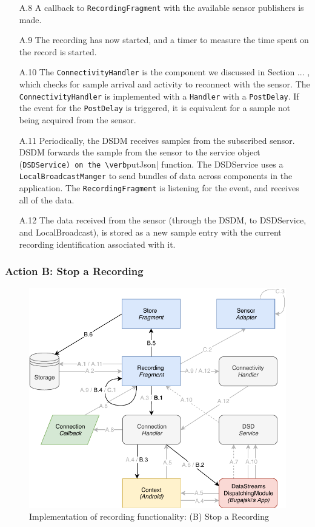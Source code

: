 \begin{itemize}
	\item[A.8] A callback to \verb|RecordingFragment|  with the available sensor publishers is made. 
	\item[A.9] The recording has now started, and a timer to measure the time spent on the record is started. 
	\item[A.10] The \verb|ConnectivityHandler| is the component we discussed in Section ... , which checks for sample arrival and activity to reconnect with the sensor. The \verb|ConnectivityHandler| is implemented with a \verb|Handler| with a \verb|PostDelay|. If the event for the \verb|PostDelay| is triggered, it is equivalent for a sample not being acquired from the sensor. 
	\item[A.11] Periodically, the DSDM receives samples from the subscribed sensor. DSDM forwards the sample from the sensor to the service object (\verb|DSDService) on the \verb|putJson| function. The DSDService uses a \verb|LocalBroadcastManger| to send bundles of data across components in the application. The \verb|RecordingFragment| is listening for the event, and receives all of the data. 
	\item[A.12] The data received from the sensor (through the DSDM, to DSDService, and LocalBroadcast), is stored as a new sample entry with the current recording identification associated with it. 
\end{itemize}

\subsubsection{Action B: Stop a Recording}
\begin{figure}
    \centering
    \includegraphics[scale=0.7]{images/Recording_ImpB.pdf}
    \caption{Implementation of recording functionality: (B) Stop a Recording}
    \label{fig:impl_recordingB}
\end{figure}


